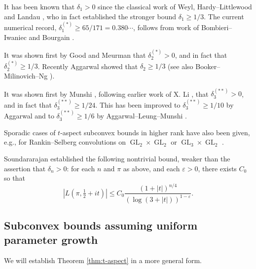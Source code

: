 \documentclass[reqno]{amsart}
\DeclareMathOperator{\GL}{GL}
\def\eps{\varepsilon}
\theoremstyle{plain} \newtheorem{theorem} {Theorem}
\theoremstyle{definition} \newtheorem{definition} [theorem] {Definition}
\theoremstyle{itplain} %
\numberwithin{equation}{section}
\numberwithin{theorem}{section}
\renewcommand{\geq}{\geqslant}
\renewcommand{\leq}{\leqslant}
\begin{document}
It has been known that $\delta_1 > 0$ since the classical work of Weyl, Hardy--Littlewood and Landau \cite{MR1511862, MR1544665}, who in fact established the stronger bound $\delta_1 \geq 1/3$.  The current numerical record, $\delta_1^{(*)} \geq 65/171 = 0.380\dotsb$, follows from work of Bombieri--Iwaniec \cite{MR881101} and Bourgain \cite{MR3556291}.

It was shown first by Good \cite{MR696884} and Meurman \cite{MR1058223} that $\delta_2^{(*)} > 0$, and in fact that $\delta_2^{(*)} \geq 1/3$.  Recently Aggarwal \cite{MR4032289} showed that $\delta_2 \geq 1/3$ (see also Booker--Milinovich--Ng \cite{MR3872849}).

 

It was shown first by Munshi \cite{MR3369905}, following earlier work of X. Li \cite{MR2753605}, that $\delta_3^{(**)} > 0$, and in fact that $\delta_3^{(**)} \geq 1/24$.  This has been improved to $\delta_3^{(**)} \geq 1/10$ by Aggarwal \cite{MR4270876} and to $\delta_3^{(**)} \geq 1/6$ by Aggarwal--Leung--Munshi \cite{2022arXiv220606517A}.


Sporadic cases of $t$-aspect subconvex bounds in higher rank have also been given, e.g., for Rankin--Selberg convolutions on $\GL_2 \times \GL_2$ \cite{MR2726097, 2021arXiv210112106B} or $\GL_3 \times \GL_2$ \cite{2018arXiv181000539M}.

Soundararajan \cite[Example 3]{MR2680497} established the following nontrivial bound, weaker than the assertion that $\delta_n > 0$: for each $n$ and $\pi$ as above, and each $\eps > 0$, there exists $C_0$ so that
\begin{equation}\label{eq:lpi-tfrac12-+-1}
  |L(\pi, \tfrac{1}{2} + i t)| \leq C_0 \frac{(1 + |t|)^{n/4} }{(\log (3 + |t|))^{1 - \eps }}.
\end{equation}



\subsection{Subconvex bounds assuming uniform parameter growth}\label{sec:subc-bounds-assum}

We will establish Theorem \ref{thm:t-aspect} in a more general form.
\end{document}
